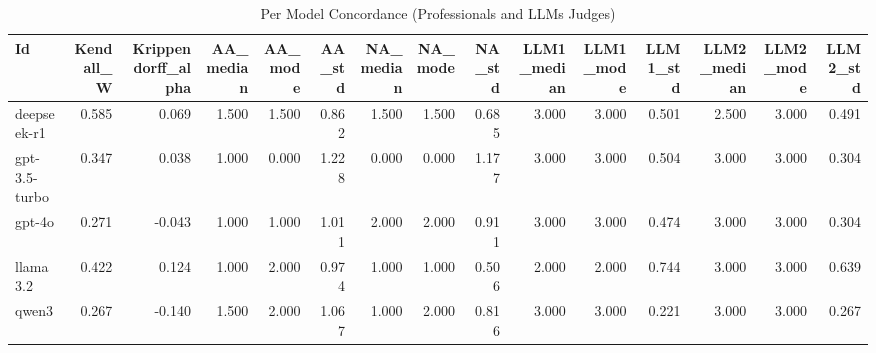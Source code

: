 \begin{table}
\caption{Per Model Concordance (Professionals and LLMs Judges)}
\label{tab:per_model_concordance_ALL_judges}
\begin{tabular}{lrrrrrrrrrrrrrr}
\toprule
Id & Kendall_W & Krippendorff_alpha & AA_median & AA_mode & AA_std & NA_median & NA_mode & NA_std & LLM1_median & LLM1_mode & LLM1_std & LLM2_median & LLM2_mode & LLM2_std \\
\midrule
deepseek-r1 & 0.585 & 0.069 & 1.500 & 1.500 & 0.862 & 1.500 & 1.500 & 0.685 & 3.000 & 3.000 & 0.501 & 2.500 & 3.000 & 0.491 \\
gpt-3.5-turbo & 0.347 & 0.038 & 1.000 & 0.000 & 1.228 & 0.000 & 0.000 & 1.177 & 3.000 & 3.000 & 0.504 & 3.000 & 3.000 & 0.304 \\
gpt-4o & 0.271 & -0.043 & 1.000 & 1.000 & 1.011 & 2.000 & 2.000 & 0.911 & 3.000 & 3.000 & 0.474 & 3.000 & 3.000 & 0.304 \\
llama3.2 & 0.422 & 0.124 & 1.000 & 2.000 & 0.974 & 1.000 & 1.000 & 0.506 & 2.000 & 2.000 & 0.744 & 3.000 & 3.000 & 0.639 \\
qwen3 & 0.267 & -0.140 & 1.500 & 2.000 & 1.067 & 1.000 & 2.000 & 0.816 & 3.000 & 3.000 & 0.221 & 3.000 & 3.000 & 0.267 \\
\bottomrule
\end{tabular}
\end{table}
